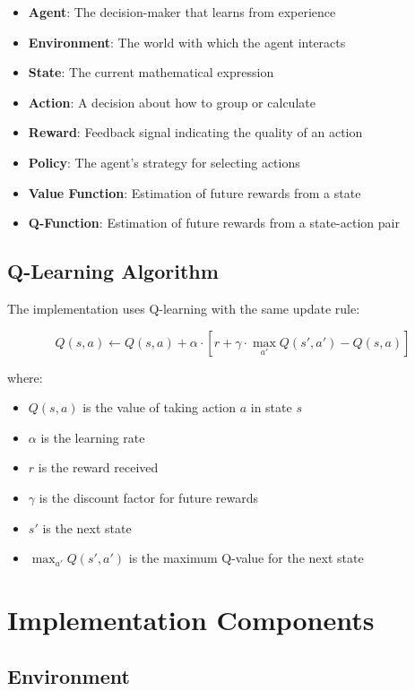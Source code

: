 \documentclass{article}
\begin{document}
\begin{itemize}
    \item \textbf{Agent}: The decision-maker that learns from experience
    \item \textbf{Environment}: The world with which the agent interacts
    \item \textbf{State}: The current mathematical expression
    \item \textbf{Action}: A decision about how to group or calculate
    \item \textbf{Reward}: Feedback signal indicating the quality of an action
    \item \textbf{Policy}: The agent's strategy for selecting actions
    \item \textbf{Value Function}: Estimation of future rewards from a state
    \item \textbf{Q-Function}: Estimation of future rewards from a state-action pair
\end{itemize}

\subsection{Q-Learning Algorithm}

The implementation uses Q-learning with the same update rule:

\begin{equation}
    Q(s, a) \leftarrow Q(s, a) + \alpha \cdot [r + \gamma \cdot \max_{a'} Q(s', a') - Q(s, a)]
\end{equation}

where:
\begin{itemize}
    \item $Q(s, a)$ is the value of taking action $a$ in state $s$
    \item $\alpha$ is the learning rate
    \item $r$ is the reward received
    \item $\gamma$ is the discount factor for future rewards
    \item $s'$ is the next state
    \item $\max_{a'} Q(s', a')$ is the maximum Q-value for the next state
\end{itemize}

\section{Implementation Components}

\subsection{Environment}
\end{document}
